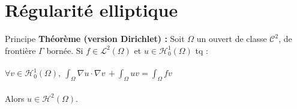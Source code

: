 \documentclass[10pt]{beamer}
\begin{document}
\section{Régularité elliptique}

\begin{frame}{Principe}
\textbf{Théorème (version Dirichlet) :} Soit $\Omega$ un ouvert de classe $\mathcal{C}^2$, de frontière $\Gamma$ bornée. Si $f \in \mathcal{L}^2(\Omega)$ et $u\in \mathcal{H}^1_0(\Omega)$ tq : \\ ~ \\  $\forall v \in \mathcal{H}^1_0(\Omega), \ \displaystyle \int_{\Omega} \nabla u \cdot \nabla v \,  + \int_{\Omega} u v =  \int_{\Omega} f v  \, $\\ ~ \\ 
Alors $u\in \mathcal{H}^2(\Omega)$.
\end{frame}
\end{document}
